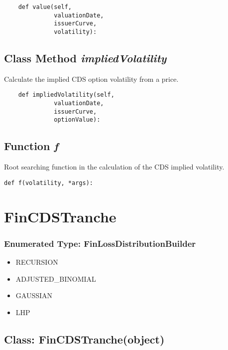 \documentclass[twoside,11pt]{book}
\begin{document}
\begin{lstlisting}
    def value(self, 
              valuationDate,
              issuerCurve,
              volatility):
\end{lstlisting}

\subsection{Class Method {\it impliedVolatility}}
Calculate the implied CDS option volatility from a price. 

\begin{lstlisting}
    def impliedVolatility(self,
              valuationDate,
              issuerCurve,
              optionValue):
\end{lstlisting}

\subsection{Function {\it f}}
Root searching function in the calculation of the CDS implied volatility. 

\begin{lstlisting}
def f(volatility, *args):
\end{lstlisting}

\newpage
\section{FinCDSTranche}

\subsubsection{Enumerated Type: FinLossDistributionBuilder}
\begin{itemize}
\item{RECURSION}
\item{ADJUSTED\_BINOMIAL}
\item{GAUSSIAN}
\item{LHP}
\end{itemize}

\subsection{Class: FinCDSTranche(object)}
\end{document}
